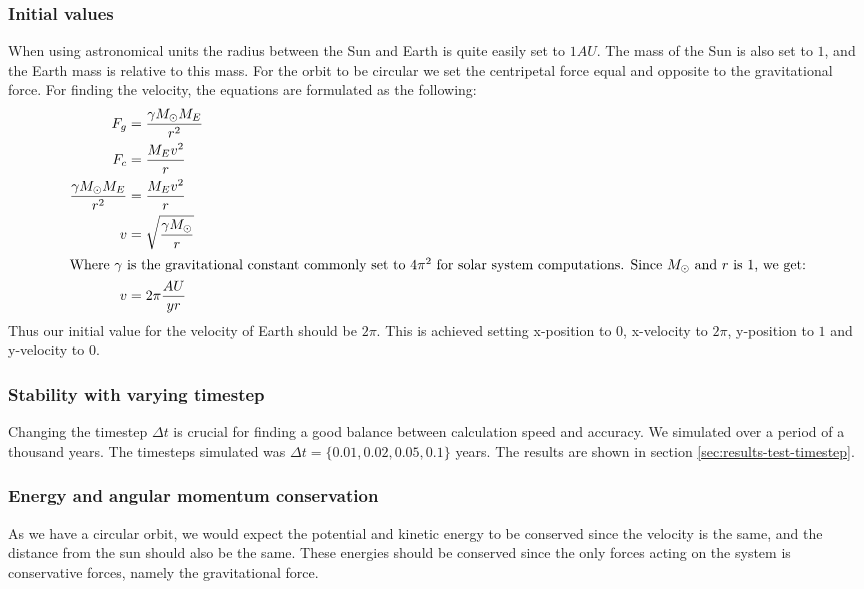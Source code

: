 \documentclass[../main.tex]{subfiles}
\begin{document}
\subsubsection{Initial values}
When using astronomical units the radius between the Sun and Earth is quite easily set to $1AU$. The mass of the Sun is also set to $1$, and the Earth mass is relative to this mass. For the orbit to be circular we set the centripetal force equal and opposite to the gravitational force. For finding the velocity, the equations are formulated as the following:
\begin{align}
  F_g &= \frac{\gamma M_\odot M_E}{r^2}\nonumber \\
  F_c &= \frac{M_E v^2}{r}\nonumber \\
  \frac{\gamma M_\odot M_E}{r^2} &= \frac{M_E v^2}{r}\nonumber \\
  v &= \sqrt{\frac{\gamma M_\odot}{r}}\nonumber \\
  \intertext{Where $\gamma$ is the gravitational constant commonly set to $4\pi^2$ for solar system computations. Since $M_\odot$ and $r$ is $1$, we get:}
  v &= 2\pi \frac{AU}{yr}
\end{align}
Thus our initial value for the velocity of Earth should be $2\pi$. This is achieved setting x-position to $0$, x-velocity to $2\pi$, y-position to $1$ and y-velocity to $0$.

\subsubsection{Stability with varying timestep}
Changing the timestep $\Delta t$ is crucial for finding a good balance between calculation speed and accuracy. We simulated over a period of a thousand years. The timesteps simulated was $\Delta t = \{0.01, 0.02, 0.05, 0.1\}$ years. The results are shown in section \ref{sec:results-test-timestep}.

\subsubsection{Energy and angular momentum conservation}
As we have a circular orbit, we would expect the potential and kinetic energy to be conserved since the velocity is the same, and the distance from the sun should also be the same. These energies should be conserved since the only forces acting on the system is conservative forces, namely the gravitational force.
\end{document}
